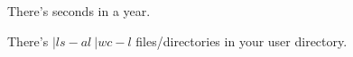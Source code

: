 There's  seconds in a year.

There's $ { | ls -al ~ | wc -l }$ files/directories in your user directory.
